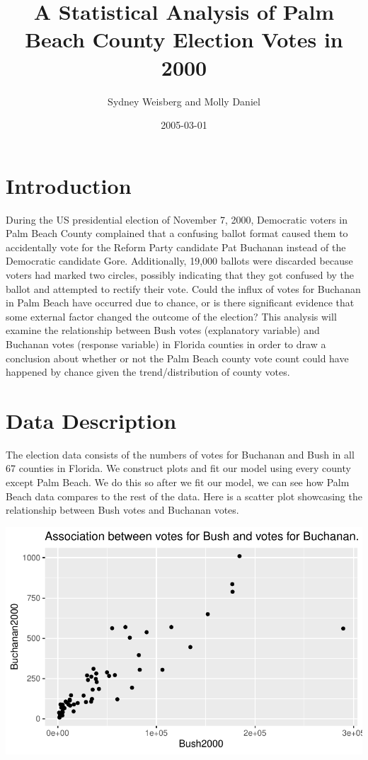 \documentclass[
  letterpaper,
  DIV=11,
  numbers=noendperiod]{scrartcl}
\title{A Statistical Analysis of Palm Beach County Election Votes in
2000}
\author{Sydney Weisberg and Molly Daniel}
\date{2005-03-01}
\begin{document}
\maketitle
\ifdefined\Shaded\renewenvironment{Shaded}{\begin{tcolorbox}[interior hidden, breakable, borderline west={3pt}{0pt}{shadecolor}, enhanced, sharp corners, frame hidden, boxrule=0pt]}{\end{tcolorbox}}\fi

\hypertarget{introduction}{%
\section{Introduction}\label{introduction}}

During the US presidential election of November 7, 2000, Democratic
voters in Palm Beach County complained that a confusing ballot format
caused them to accidentally vote for the Reform Party candidate Pat
Buchanan instead of the Democratic candidate Gore. Additionally, 19,000
ballots were discarded because voters had marked two circles, possibly
indicating that they got confused by the ballot and attempted to rectify
their vote. Could the influx of votes for Buchanan in Palm Beach have
occurred due to chance, or is there significant evidence that some
external factor changed the outcome of the election? This analysis will
examine the relationship between Bush votes (explanatory variable) and
Buchanan votes (response variable) in Florida counties in order to draw
a conclusion about whether or not the Palm Beach county vote count could
have happened by chance given the trend/distribution of county votes.

\hypertarget{data-description}{%
\section{Data Description}\label{data-description}}

The election data consists of the numbers of votes for Buchanan and Bush
in all 67 counties in Florida. We construct plots and fit our model
using every county except Palm Beach. We do this so after we fit our
model, we can see how Palm Beach data compares to the rest of the data.
Here is a scatter plot showcasing the relationship between Bush votes
and Buchanan votes.

\includegraphics{case_study_1_files/figure-pdf/warning-FALSE-1.pdf}
\end{document}
